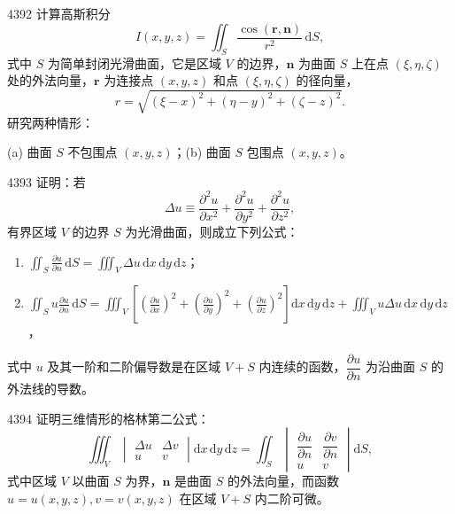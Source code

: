 \begin{prob}[M]{4392}
计算高斯积分
\[I(x,y,z) = \iint_{S} \frac{\cos(\boldsymbol{r}, \boldsymbol{n})}{r^{2}}\,\mathrm{d}S,\]
式中 $S$ 为简单封闭光滑曲面，它是区域 $V$ 的边界，$\boldsymbol{n}$ 为曲面 $S$ 上在点 $(\xi, \eta, \zeta)$ 处的外法向量，$\boldsymbol{r}$ 为连接点 $(x,y,z)$ 和点 $(\xi, \eta, \zeta)$ 的径向量，
\[r = \sqrt{(\xi-x)^{2}+(\eta-y)^{2}+(\zeta-z)^{2}}.\]
研究两种情形：

(a) 曲面 $S$ 不包围点 $(x,y,z)$；\qquad (b) 曲面 $S$ 包围点 $(x,y,z)$。
\end{prob}

\begin{prob}[L]{4393}
证明：若
\[\Delta u \equiv \frac{\partial^{2} u}{\partial x^{2}} + \frac{\partial^{2} u}{\partial y^{2}} + \frac{\partial^{2} u}{\partial z^{2}},\]
有界区域 $V$ 的边界 $S$ 为光滑曲面，则成立下列公式：
\begin{enumerate}[label=(\alph*), itemsep=2pt, topsep=3pt]
\item $\displaystyle \iint_{S} \frac{\partial u}{\partial n}\,\mathrm{d}S = \iiint_{V} \Delta u\,\mathrm{d}x\,\mathrm{d}y\,\mathrm{d}z$；
\item $\displaystyle \iint_{S} u \frac{\partial u}{\partial n}\,\mathrm{d}S = \iiint_{V} \left[\left(\frac{\partial u}{\partial x}\right)^{2} + \left(\frac{\partial u}{\partial y}\right)^{2} + \left(\frac{\partial u}{\partial z}\right)^{2}\right]\mathrm{d}x\,\mathrm{d}y\,\mathrm{d}z + \iiint_{V} u \Delta u\,\mathrm{d}x\,\mathrm{d}y\,\mathrm{d}z$，
\end{enumerate}
式中 $u$ 及其一阶和二阶偏导数是在区域 $V+S$ 内连续的函数，$\dfrac{\partial u}{\partial n}$ 为沿曲面 $S$ 的外法线的导数。
\end{prob}

\begin{prob}[M]{4394}
证明三维情形的格林第二公式：
\[\iiint_{V} \begin{vmatrix} \Delta u & \Delta v \\ u & v \end{vmatrix} \mathrm{d}x\,\mathrm{d}y\,\mathrm{d}z = \iint_{S} \begin{vmatrix} \dfrac{\partial u}{\partial n} & \dfrac{\partial v}{\partial n} \\ u & v \end{vmatrix} \mathrm{d}S,\]
式中区域 $V$ 以曲面 $S$ 为界，$\boldsymbol{n}$ 是曲面 $S$ 的外法向量，而函数 $u = u(x,y,z), v = v(x,y,z)$ 在区域 $V+S$ 内二阶可微。
\end{prob}

